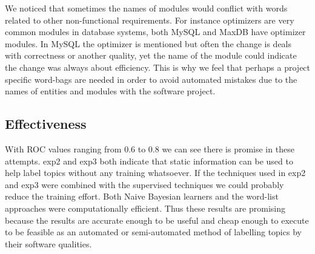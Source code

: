 \documentclass{acm_proc_article-sp}
\begin{document}
We noticed that sometimes the names of modules would conflict with words related to other non-functional requirements. For instance optimizers are very common modules in database systems, both MySQL and MaxDB have optimizer modules. In MySQL the optimizer is mentioned but often the change is deals with correctness or another quality, yet the name of the module could indicate the change was always about efficiency. This is why we feel that perhaps a project specific word-bags are needed in order to avoid automated mistakes due to the names of entities and modules with the software project.

\subsection{Effectiveness}


With ROC values ranging from $0.6$ to $0.8$ we can see there is promise in these attempts. \textsf{exp2} and \textsf{exp3} both indicate that static information can be used to help label topics without any training whatsoever. If the techniques used in \textsf{exp2} and \textsf{exp3} were combined with the supervised techniques we could probably reduce the training effort. 
Both Naive Bayesian learners and the word-list approaches were computationally efficient. Thus these results are promising because the results are accurate enough to be useful and cheap enough to execute to be feasible as an automated or semi-automated method of labelling topics by their software qualities.
\end{document}
